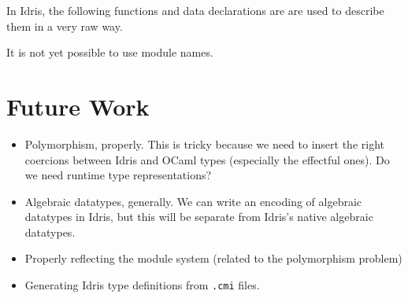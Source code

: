\documentclass[a4paper,11pt,twocolumn]{article}
\begin{document}
In Idris, the following functions and data declarations are are used to 
describe them in a very raw way.

It is not yet possible to use module names.



\section{Future Work}

\begin{itemize}
\item Polymorphism, properly. This is tricky because we need to insert
  the right coercions between Idris and OCaml types (especially the
  effectful ones). Do we need runtime type representations?
\item Algebraic datatypes, generally. We can write an encoding of
  algebraic datatypes in Idris, but this will be separate from Idris's
  native algebraic datatypes.
\item Properly reflecting the module system (related to the
  polymorphism problem)
\item Generating Idris type definitions from \texttt{.cmi} files.
\end{itemize}
\end{document}
